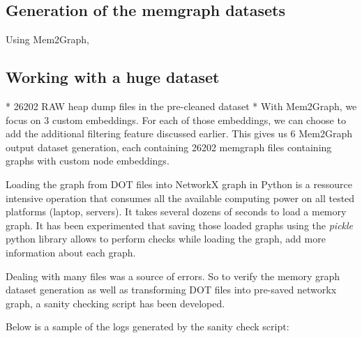 \subsection{Generation of the memgraph datasets}
Using Mem2Graph, 

\subsection{Working with a huge dataset}

* 26202 RAW heap dump files in the pre-cleaned dataset
* With Mem2Graph, we focus on 3 custom embeddings. For each of those embeddings, we can choose to add the additional filtering feature discussed earlier. This gives us 6 Mem2Graph output dataset generation, each containing 26202 memgraph files containing graphs with custom node embeddings.

Loading the graph from DOT files into NetworkX graph in Python is a ressource intensive operation that consumes all the available computing power on all tested platforms (laptop, servers). It takes several dozens of seconds to load a memory graph. It has been experimented that saving those loaded graphs using the \textit{pickle} python library allows to perform checks while loading the graph, add more information about each graph. 

Dealing with many files was a source of errors. So to verify the memory graph dataset generation as well as transforming DOT files into pre-saved networkx graph, a sanity checking script has been developed.




Below is a sample of the logs generated by the sanity check script:

